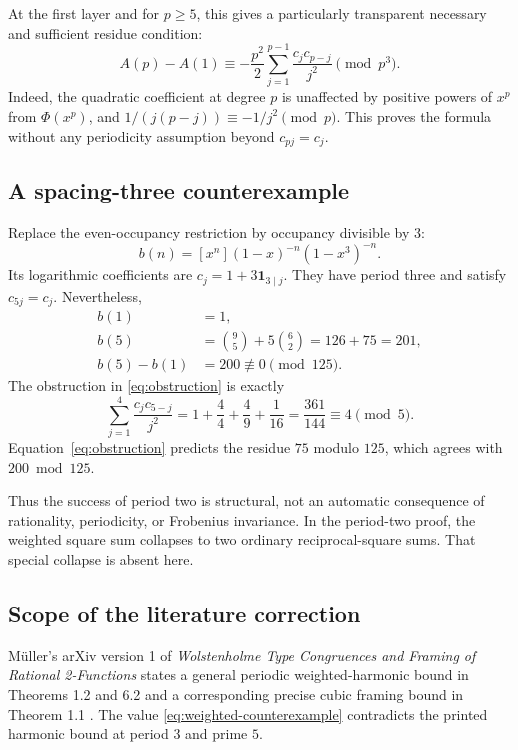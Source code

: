 \documentclass[11pt,a4paper]{article}
\numberwithin{equation}{section}
\theoremstyle{definition}
\theoremstyle{remark}
\begin{document}
At the first layer and for $p\ge5$, this gives a particularly transparent
necessary and sufficient residue condition:
\begin{equation}\label{eq:obstruction}
 A(p)-A(1)\equiv
 -\frac{p^2}{2}\sum_{j=1}^{p-1}\frac{c_jc_{p-j}}{j^2}
 \pmod{p^3}.
\end{equation}
Indeed, the quadratic coefficient at degree $p$ is unaffected by positive
powers of $x^p$ from $\Phi(x^p)$, and
$1/(j(p-j))\equiv-1/j^2\pmod p$. This proves the formula without any
periodicity assumption beyond $c_{pj}=c_j$.

\subsection{A spacing-three counterexample}
Replace the even-occupancy restriction by occupancy divisible by $3$:
\begin{equation}\label{eq:bn-boundary}
 b(n)=[x^n](1-x)^{-n}(1-x^3)^{-n}.
\end{equation}
Its logarithmic coefficients are
$c_j=1+3\mathbf1_{3\mid j}$. They have period three and satisfy $c_{5j}=c_j$.
Nevertheless,
\begin{align*}
 b(1)&=1,\\
 b(5)&=\binom95+5\binom62=126+75=201,\\
 b(5)-b(1)&=200\not\equiv0\pmod{125}.
\end{align*}
The obstruction in \eqref{eq:obstruction} is exactly
\begin{equation}\label{eq:weighted-counterexample}
 \sum_{j=1}^4\frac{c_jc_{5-j}}{j^2}
 =1+\frac44+\frac49+\frac1{16}
 =\frac{361}{144}\equiv4\pmod5.
\end{equation}
Equation~\eqref{eq:obstruction} predicts the residue $75$ modulo $125$,
which agrees with $200\bmod125$.

Thus the success of period two is structural, not an automatic consequence
of rationality, periodicity, or Frobenius invariance. In the period-two
proof, the weighted square sum collapses to two ordinary reciprocal-square
sums. That special collapse is absent here.

\subsection{Scope of the literature correction}
M\"uller's arXiv version 1 of \emph{Wolstenholme Type Congruences and Framing
of Rational 2-Functions} states a general periodic weighted-harmonic bound
in Theorems 1.2 and 6.2 and a corresponding precise cubic framing bound in
Theorem 1.1 \cite{muller}. The value \eqref{eq:weighted-counterexample}
contradicts the printed harmonic bound at period $3$ and prime $5$.
\end{document}
